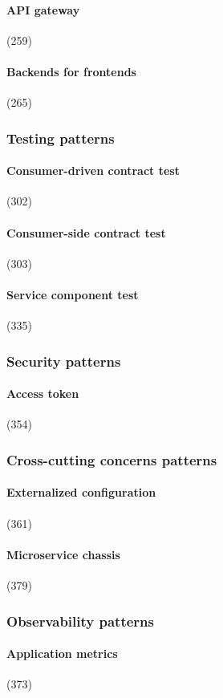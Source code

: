 \paragraph{API gateway} (259)
\paragraph{Backends for frontends} (265)

\subsubsection{Testing patterns}
\paragraph{Consumer-driven contract test} (302)
\paragraph{Consumer-side contract test} (303)
\paragraph{Service component test} (335)

\subsubsection{Security patterns}
\paragraph{Access token} (354)

\subsubsection{Cross-cutting concerns patterns}
\paragraph{Externalized configuration} (361)
\paragraph{Microservice chassis} (379)

\subsubsection{Observability patterns}
\paragraph{Application metrics} (373)
